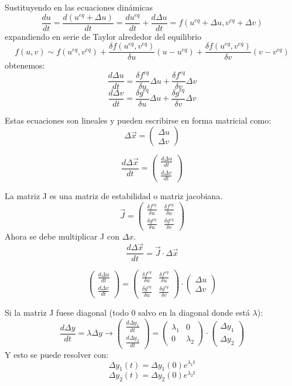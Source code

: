 Sustituyendo en las ecuaciones dinámicas
$$\frac{du}{dt} = \frac{d(u^{eq} + \Delta u)}{dt} = \frac{du^{eq}}{dt} + \frac{d \Delta u}{dt} = f(u^{eq} + \Delta u, v^{eq} + \Delta v)$$
expandiendo en serie de Taylor alrededor del equilibrio
$$f(u, v) \sim f(u^{eq}, v^{eq}) + \frac{\delta f(u^{eq}, v^{eq})}{\delta u}(u - u^{eq}) + \frac{\delta f(u^{eq}, v^{eq})}{\delta v}(v - v^{eq})$$
obtenemos:
$$\frac{d \Delta u}{dt} = \frac{\delta f^{eq}}{\delta u} \Delta u + \frac{\delta f^{eq}}{\delta v} \Delta v$$
$$\frac{d \Delta v}{dt} = \frac{\delta g^{eq}}{\delta u} \Delta u + \frac{\delta g^{eq}}{\delta v} \Delta v$$

Estas ecuaciones son lineales y pueden escribirse en forma matricial como:
$$\Delta \vec{x} = \begin{pmatrix}
\Delta u \\ \Delta v
\end{pmatrix} $$

$$\frac{d \Delta \vec{x}}{dt} = \begin{pmatrix}
\frac{d \Delta u}{dt} \\ \frac{d \Delta v}{dt}
\end{pmatrix}$$

La matriz J es una matriz de estabilidad o matriz jacobiana.
$$\vec{J} = \begin{pmatrix}
\frac{\delta f^{eq}}{\delta u} & \frac{\delta f^{eq}}{\delta u} \\
\frac{\delta g^{eq}}{\delta u} & \frac{\delta g^{eq}}{\delta v}
\end{pmatrix}$$
Ahora se debe multiplicar J con $\Delta x$.
$$\frac{d \Delta \vec{x}}{dt} = \vec{J} \cdot \Delta \vec{x}$$

$$\begin{pmatrix}
\frac{d \Delta u}{dt} \\ \frac{d \Delta v}{dt}
\end{pmatrix} = \begin{pmatrix}
\frac{\delta f^{eq}}{\delta u} & \frac{\delta f^{eq}}{\delta u} \\
\frac{\delta g^{eq}}{\delta u} & \frac{\delta g^{eq}}{\delta v}
\end{pmatrix} \cdot \begin{pmatrix}
\Delta u \\ \Delta v
\end{pmatrix}$$

Si la matriz J fuese diagonal (todo 0 salvo en la diagonal donde está $\lambda$):
$$\frac{d \Delta y}{dt} = \lambda \Delta y \rightarrow \begin{pmatrix}
\frac{d \Delta y_1}{dt} \\ \frac{d \Delta y_2}{dt}
\end{pmatrix} = \begin{pmatrix}
\lambda_1 & 0 \\ 0 & \lambda_2
\end{pmatrix} \cdot \begin{pmatrix}
\Delta y_1 \\ \Delta y_2
\end{pmatrix}$$
Y esto se puede resolver con:
$$\Delta y_1 (t) = \Delta y_1 (0) e^{\lambda_1 t}$$
$$\Delta y_2 (t) = \Delta y_2 (0) e^{\lambda_2 t}$$

